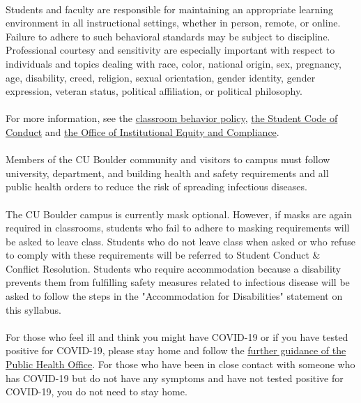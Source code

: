 \documentclass[11pt]{article}
\begin{document}
\\
Students and faculty are responsible for maintaining an appropriate learning environment in all instructional settings, whether in person, remote, or online. Failure to adhere to such behavioral standards may be subject to discipline. Professional courtesy and sensitivity are especially important with respect to individuals and topics dealing with race, color, national origin, sex, pregnancy, age, disability, creed, religion, sexual orientation, gender identity, gender expression, veteran status, political affiliation, or political philosophy.\\
\\
For more information, see the \href{https://www.colorado.edu/policies/student-classroom-course-related-behavior}{classroom behavior policy}, \href{https://www.colorado.edu/sccr/student-conduct}{the Student Code of Conduct} and \href{https://www.colorado.edu/oiec/}{the Office of Institutional Equity and Compliance}.\\

\\
Members of the CU Boulder community and visitors to campus must follow university, department, and building health and safety requirements and all public health orders to reduce the risk of spreading infectious diseases. \\
\\
The CU Boulder campus is currently mask optional. However, if masks are again required in classrooms, students who fail to adhere to masking requirements will be asked to leave class. Students who do not leave class when asked or who refuse to comply with these requirements will be referred to Student Conduct & Conflict Resolution. Students who require accommodation because a disability prevents them from fulfilling safety measures related to infectious disease will be asked to follow the steps in the "Accommodation for Disabilities" statement on this syllabus.\\
\\
For those who feel ill and think you might have COVID-19 or if you have tested positive for COVID-19, please stay home and follow the \href{https://www.colorado.edu/healthcenter/coronavirus-updates/symptoms-and-what-do-if-you-feel-sick}{further guidance of the Public Health Office}. For those who have been in close contact with someone who has COVID-19 but do not have any symptoms and have not tested positive for COVID-19, you do not need to stay home. \\
\end{document}
